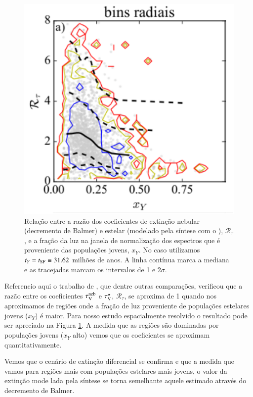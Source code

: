 \begin{figure}
	\centering
	\includegraphics{figuras/RtauVxY.pdf}
	\caption[$\mathcal{R}_\tau \times x_Y$]
	{Relação entre a razão dos coeficientes de extinção nebular (decremento de Balmer) e estelar (modelado pela síntese com o \starlight), $\mathcal{R}_\tau$, e a fração da luz na janela de normalização dos espectros que é proveniente das populações jovens, $x_Y$. No caso utilizamos $t_Y = t_{\rm SF} \equiv 31.62$ milhões de anos. A linha contínua marca a mediana e as tracejadas marcam os intervalos de 1 e 2$\sigma$. }
	\label{fig:RtauVxY}
\end{figure}

Referencio aqui o trabalho de \citet{Mari2016}, que dentre outras comparações, verificou que a razão entre os coeficientes $\tau_{\mathrm{V}}^{\mathrm{neb}}$ e $\tau_{\mathrm{V}}^\star$, $\mathcal{R}_\tau$, se aproxima de 1 quando nos aproximamos de regiões onde a fração de luz proveniente de populações estelares jovens ($x_Y$) é maior. Para nosso estudo espacialmente resolvido o resultado pode ser apreciado na Figura \ref{fig:RtauVxY}. A medida que as regiões são dominadas por populações jovens ($x_Y$ alto) vemos que os coeficientes se aproximam quantitativamente.

Vemos que o cenário de extinção diferencial se confirma e que a medida que vamos para regiões mais com populações estelares mais jovens, o valor da extinção mode lada pela síntese se torna semelhante aquele estimado através do decremento de Balmer.

